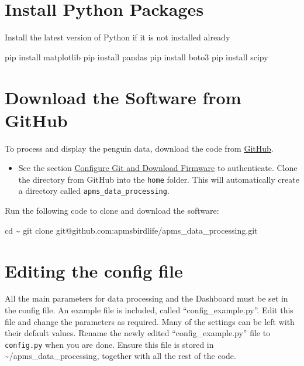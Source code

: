 \documentclass[
  letterpaper,
]{scrbook}
\newenvironment{Shaded}{\begin{snugshade}}{\end{snugshade}}
\newcommand{\BuiltInTok}[1]{\textcolor[rgb]{0.00,0.23,0.31}{#1}}
\newcommand{\ExtensionTok}[1]{\textcolor[rgb]{0.00,0.23,0.31}{#1}}
\newcommand{\FunctionTok}[1]{\textcolor[rgb]{0.28,0.35,0.67}{#1}}
\newcommand{\NormalTok}[1]{\textcolor[rgb]{0.00,0.23,0.31}{#1}}
\providecommand{\tightlist}{%
  \setlength{\itemsep}{0pt}\setlength{\parskip}{0pt}}
\begin{document}
\section{Install Python Packages}\label{install-python-packages}

Install the latest version of Python if it is not installed already

\begin{Shaded}
\begin{Highlighting}[]
\ExtensionTok{pip}\NormalTok{ install matplotlib}
\ExtensionTok{pip}\NormalTok{ install pandas}
\ExtensionTok{pip}\NormalTok{ install boto3}
\ExtensionTok{pip}\NormalTok{ install scipy}
\end{Highlighting}
\end{Shaded}

\section{Download the Software from
GitHub}\label{download-the-software-from-github}

To process and display the penguin data, download the code from
\href{https://www.github.com/apmsbirdlife}{GitHub}.

\begin{itemize}
\tightlist
\item
  See the section
  \hyperref[Configureux5cux2520Gitux5cux2520andux5cux2520Downloadux5cux2520Firmware]{Configure
  Git and Download Firmware} to authenticate. Clone the directory from
  GitHub into the \texttt{home} folder. This will automatically create a
  directory called \texttt{apms\_data\_processing}.
\end{itemize}

Run the following code to clone and download the software:

\begin{Shaded}
\begin{Highlighting}[]
\BuiltInTok{cd}\NormalTok{ \textasciitilde{}}
\FunctionTok{git}\NormalTok{ clone git@github.com:apmsbirdlife/apms\_data\_processing.git}
\end{Highlighting}
\end{Shaded}

\section{Editing the config file}\label{editing-the-config-file}

All the main parameters for data processing and the Dashboard must be
set in the config file. An example file is included, called
``config\_example.py''. Edit this file and change the parameters as
required. Many of the settings can be left with their default values.
Rename the newly edited ``config\_example.py'' file to
\texttt{config.py} when you are done. Ensure this file is stored in
\textasciitilde/apms\_data\_processing, together with all the rest of
the code.
\end{document}
